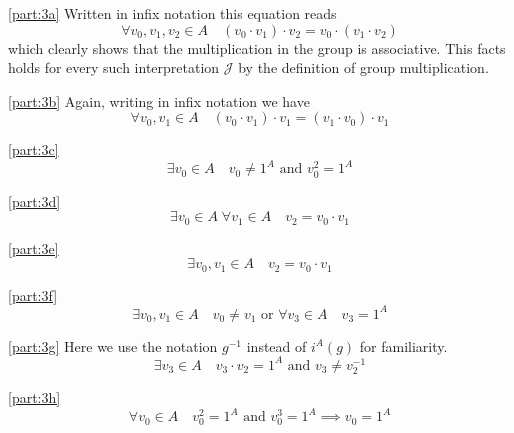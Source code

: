 \documentclass[boxes,pages,color=CornflowerBlue]{homework}
\begin{document}
\begin{solution}
    \ref{part:3a}
    Written in infix notation this equation reads
    \begin{equation*}
        \forall v_0, v_1, v_2 \in A \quad (v_0 \cdot v_1) \cdot v_2 = v_0 \cdot (v_1 \cdot v_2)
    \end{equation*}
    which clearly shows that the multiplication in the group is associative.
    This facts holds for every such interpretation $\mathcal{J}$ by the definition of group multiplication.

    \ref{part:3b}
    Again, writing in infix notation we have
    \begin{equation*}
        \forall v_0, v_1 \in A \quad (v_0 \cdot v_1) \cdot v_1 = (v_1 \cdot v_0) \cdot v_1
    \end{equation*}

    \ref{part:3c}
    \begin{equation*}
        \exists v_0 \in A \quad v_0 \neq 1^A \text{ and } v_0^2 = 1^A
    \end{equation*}

    \ref{part:3d}
    \begin{equation*}
        \exists v_0\in A \; \forall v_1 \in A \quad v_2 = v_0 \cdot v_1
    \end{equation*}

    \ref{part:3e}
    \begin{equation*}
        \exists v_0, v_1 \in A \quad v_2 = v_0 \cdot v_1
    \end{equation*}

    \ref{part:3f}
    \begin{equation*}
        \exists v_0, v_1 \in A \quad v_0 \neq v_1 \text{ or } \forall v_3 \in A \quad v_3 = 1^A
    \end{equation*}

    \ref{part:3g}
    Here we use the notation $g^{-1}$ instead of $i^A(g)$ for familiarity.
    \begin{equation*}
        \exists v_3 \in A \quad v_3\cdot v_2 = 1^A \text{ and } v_3 \neq v_2^{-1}
    \end{equation*}

    \ref{part:3h}
    \begin{equation*}
        \forall v_0 \in A \quad v_0^2 = 1^A \text{ and } v_0^3 = 1^A \implies v_0 = 1^A
    \end{equation*}
\end{solution}
\end{document}
